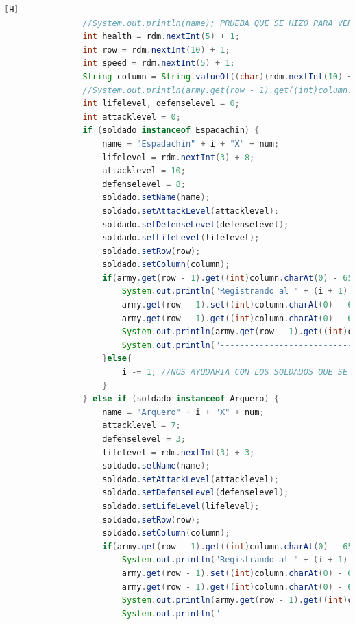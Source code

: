 \documentclass{article}
\begin{document}
\begin{lstlisting}[language=java,caption={Las lineas de codigos de la clase Mapa}][H]
				//System.out.println(name); PRUEBA QUE SE HIZO PARA VER LOS NOMBRES
				int health = rdm.nextInt(5) + 1;
				int row = rdm.nextInt(10) + 1;
				int speed = rdm.nextInt(5) + 1;
				String column = String.valueOf((char)(rdm.nextInt(10) + 65)); //REUTILIZAMOS CODIGO DEL ANTERIOR ARCHIVO VIDEOJUEGO2.JAVA YA QUE TENDRIAN LA MISMA FUNCIONALIDAD
				//System.out.println(army.get(row - 1).get((int)column.charAt(0) - 65)); PRUEBA QUE SE HIZO PARA COMPROBAR SI EL OBJETO SE ESTABA DANDO O NO CAPAZ NI EXISTIA  
				int lifelevel, defenselevel = 0;
				int attacklevel = 0;
				if (soldado instanceof Espadachin) {
					name = "Espadachin" + i + "X" + num; 
					lifelevel = rdm.nextInt(3) + 8; 
					attacklevel = 10;
					defenselevel = 8;
					soldado.setName(name);                  
					soldado.setAttackLevel(attacklevel);
					soldado.setDefenseLevel(defenselevel);                    
					soldado.setLifeLevel(lifelevel);
					soldado.setRow(row);
					soldado.setColumn(column);
					if(army.get(row - 1).get((int)column.charAt(0) - 65) == null){
						System.out.println("Registrando al " + (i + 1) + " soldado del Ejercito " + armyespe + "");
						army.get(row - 1).set((int)column.charAt(0) - 65, new Espadachin(name, attacklevel, defenselevel, lifelevel, speed, "Espadachin", true, row, column, attacklevel));
						army.get(row - 1).get((int)column.charAt(0) - 65).setSpeed(speed);
						System.out.println(army.get(row - 1).get((int)column.charAt(0) - 65).toString());
						System.out.println("---------------------------------");
					}else{
						i -= 1; //NOS AYUDARIA CON LOS SOLDADOS QUE SE REPITEN EN EL MISMO CASILLERO CON TAL QUE NO DEBERIA CONTAR 
					}
				} else if (soldado instanceof Arquero) {
					name = "Arquero" + i + "X" + num; 
					attacklevel = 7;
					defenselevel = 3;
					lifelevel = rdm.nextInt(3) + 3; 
					soldado.setName(name);                  
					soldado.setAttackLevel(attacklevel);
					soldado.setDefenseLevel(defenselevel);                    
					soldado.setLifeLevel(lifelevel);
					soldado.setRow(row);
					soldado.setColumn(column);
					if(army.get(row - 1).get((int)column.charAt(0) - 65) == null){
						System.out.println("Registrando al " + (i + 1) + " soldado del Ejercito " + armyespe + "");
						army.get(row - 1).set((int)column.charAt(0) - 65, new Arquero(name, attacklevel, defenselevel, lifelevel, speed, "Arquero", true, row, column, attacklevel));
						army.get(row - 1).get((int)column.charAt(0) - 65).setSpeed(speed);
						System.out.println(army.get(row - 1).get((int)column.charAt(0) - 65).toString());
						System.out.println("---------------------------------");

\end{lstlisting}
\end{document}
